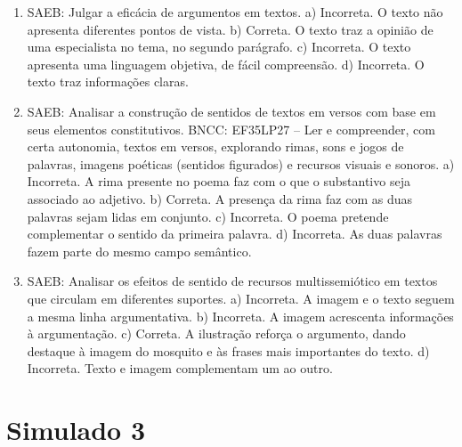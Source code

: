 \begin{enumerate}
\item
SAEB: Julgar a eficácia de argumentos em textos. a) Incorreta. O texto não apresenta diferentes pontos de vista. b) Correta. O texto traz a opinião de uma especialista no tema, no segundo parágrafo. c) Incorreta. O texto apresenta uma linguagem objetiva, de fácil compreensão. d) Incorreta. O texto traz informações claras.

\item
SAEB: Analisar a construção de sentidos de textos em versos com base em seus elementos constitutivos. BNCC: EF35LP27 -- Ler e compreender, com certa autonomia, textos em versos, explorando rimas, sons e jogos de palavras, imagens poéticas (sentidos figurados) e recursos visuais e sonoros. a) Incorreta. A rima presente no poema faz com o que o substantivo seja associado ao adjetivo. b) Correta. A presença da rima faz com as duas palavras sejam lidas em conjunto. c) Incorreta. O poema pretende complementar o sentido da primeira palavra. d) Incorreta. As duas palavras fazem parte do mesmo campo semântico.

\item
SAEB: Analisar os efeitos de sentido de recursos multissemiótico em textos que circulam em diferentes suportes. a) Incorreta. A imagem e o texto seguem a mesma linha argumentativa. b) Incorreta. A imagem acrescenta informações à argumentação. c) Correta. A ilustração reforça o argumento, dando destaque à imagem do mosquito e às frases mais importantes do texto. d) Incorreta. Texto e imagem complementam um ao outro.
\end{enumerate}

\section*{Simulado 3}

